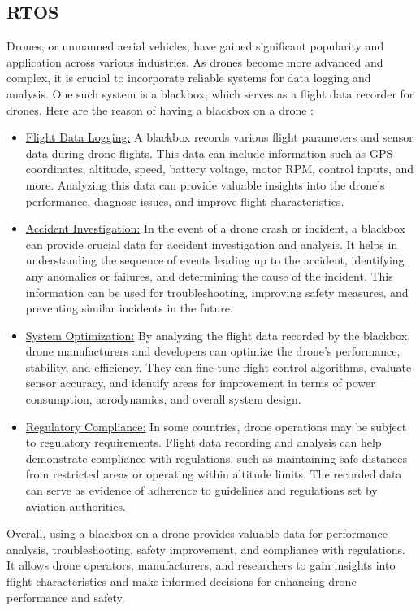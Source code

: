 \subsection{RTOS}
Drones, or unmanned aerial vehicles, have gained significant popularity and application across various industries. As drones become more advanced and complex, it is crucial to incorporate reliable systems for data logging and analysis. One such system is a blackbox, which serves as a flight data recorder for drones. Here are the reason of having a blackbox on a drone :
\begin{itemize}
    \item \underline{Flight Data Logging:} A blackbox records various flight parameters and sensor data during drone flights. This data can include information such as GPS coordinates, altitude, speed, battery voltage, motor RPM, control inputs, and more. Analyzing this data can provide valuable insights into the drone's performance, diagnose issues, and improve flight characteristics.
    \item \underline{Accident Investigation:} In the event of a drone crash or incident, a blackbox can provide crucial data for accident investigation and analysis. It helps in understanding the sequence of events leading up to the accident, identifying any anomalies or failures, and determining the cause of the incident. This information can be used for troubleshooting, improving safety measures, and preventing similar incidents in the future.
    \item \underline{System Optimization:} By analyzing the flight data recorded by the blackbox, drone manufacturers and developers can optimize the drone's performance, stability, and efficiency. They can fine-tune flight control algorithms, evaluate sensor accuracy, and identify areas for improvement in terms of power consumption, aerodynamics, and overall system design.
    \item \underline{Regulatory Compliance:} In some countries, drone operations may be subject to regulatory requirements. Flight data recording and analysis can help demonstrate compliance with regulations, such as maintaining safe distances from restricted areas or operating within altitude limits. The recorded data can serve as evidence of adherence to guidelines and regulations set by aviation authorities.
\end{itemize}
\hfill \break
Overall, using a blackbox on a drone provides valuable data for performance analysis, troubleshooting, safety improvement, and compliance with regulations. It allows drone operators, manufacturers, and researchers to gain insights into flight characteristics and make informed decisions for enhancing drone performance and safety.
